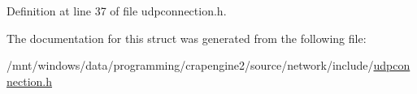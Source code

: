 Definition at line 37 of file udpconnection.\+h.



The documentation for this struct was generated from the following file\+:\begin{DoxyCompactItemize}
\item 
/mnt/windows/data/programming/crapengine2/source/network/include/\hyperlink{udpconnection_8h}{udpconnection.\+h}\end{DoxyCompactItemize}
